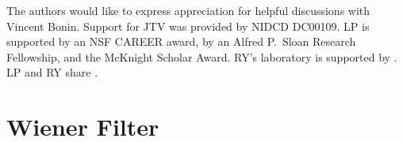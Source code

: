 The authors would like to express appreciation for helpful discussions with Vincent Bonin.  Support for JTV was provided by NIDCD DC00109. LP is supported by an NSF CAREER award, by an Alfred P.\ Sloan Research Fellowship, and the McKnight Scholar Award. RY's laboratory is supported by .  LP and RY share .

\appendix
\section{Wiener Filter} \label{sec:wiener}


%
%

%

% 


